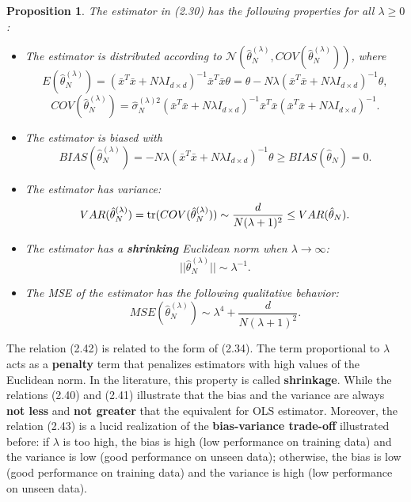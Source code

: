 \documentclass{report}
\newtheorem{proposition}{Proposition}[chapter]
\begin{document}
\begin{proposition}
The estimator in (2.30) has the following properties for all $\lambda \geq 0$:
\begin{itemize}
\item The estimator is distributed according to $\mathcal{N}(\hat{\theta}_N^{(\lambda)}, COV(\hat{\theta}_N^{(\lambda)}))$, where
\begin{equation}
E(\hat{\theta}_N^{(\lambda)}) =  (\bar{x}^T\bar{x}+N\lambda I_{d\times d})^{-1}\bar{x}^T\bar{x}\theta = \theta -N\lambda (\bar{x}^T\bar{x}+N\lambda I_{d\times d})^{-1}\theta,
\end{equation}
\begin{equation}
COV(\hat{\theta}_N^{(\lambda)}) =\hat{\sigma}_N^{(\lambda)2} (\bar{x}^T\bar{x}+N\lambda I_{d\times d})^{-1}\bar{x}^T\bar{x}(\bar{x}^T\bar{x}+N\lambda I_{d\times d})^{-1}.
\end{equation}
\item The estimator is biased with
\begin{equation}
BIAS(\hat{\theta}_N^{(\lambda)}) = -N\lambda (\bar{x}^T\bar{x}+N\lambda I_{d\times d})^{-1}\theta \geq BIAS(\hat{\theta}_N) = 0.
\end{equation}
\item The estimator has variance:
\begin{equation}
VAR(\hat{\theta}_N^{(\lambda)}) = \textup{tr}(COV(\hat{\theta}_N^{(\lambda)})) \sim \frac{d}{N(\lambda + 1)^2} \leq VAR(\hat{\theta}_N).
\end{equation}
\item The estimator has a \textbf{shrinking} Euclidean norm when $\lambda \to \infty$:
\begin{equation}
||\hat{\theta}_N^{(\lambda)}|| \sim \lambda^{-1}.
\end{equation}
\item The MSE of the estimator has the following qualitative behavior:
\begin{equation}
MSE(\hat{\theta}_N^{(\lambda)}) \sim \lambda^4 +  \frac{d}{N(\lambda + 1)^2}.
\end{equation}
\end{itemize}
\end{proposition}

The relation (2.42) is related to the form of (2.34). The term proportional to $\lambda$ acts as a \textbf{penalty} term that penalizes estimators with high values of the Euclidean norm. In the literature, this property is called \textbf{shrinkage}. While the relations (2.40) and (2.41) illustrate that the bias and the variance are always \textbf{not less} and \textbf{not greater} that the equivalent for OLS estimator. Moreover, the relation (2.43) is a lucid realization of the \textbf{bias-variance trade-off} illustrated before: if $\lambda$ is too high, the bias is high (low performance on training data) and the variance is low (good performance on unseen data); otherwise, the bias is low (good performance on training data) and the variance is high (low performance on unseen data).
\end{document}
